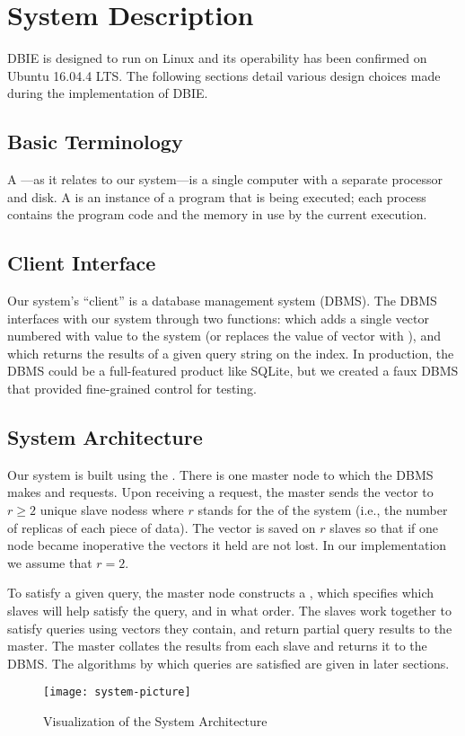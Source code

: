 \section{System Description}
DBIE is designed to run on Linux and its operability has been confirmed on
Ubuntu 16.04.4 LTS. The following sections detail various design choices made
during the implementation of DBIE.
%
\subsection{Basic Terminology}
A ---as it relates to our system---is a single computer with a
separate processor and disk. A  is an instance of a program that
is being executed; each process contains the program code and the memory in use
by the current execution.
%
\subsection{Client Interface}
Our system's ``client'' is a database management system (DBMS). The DBMS
interfaces with our system through two functions:  which adds a
single vector numbered  with value  to the system (or replaces
the value of vector  with ), and  which returns
the results of a given query string  on the index. In production, the
DBMS could be a full-featured product like SQLite, but we created a faux DBMS
that provided fine-grained control for testing.
%
\subsection{System Architecture}
Our system is built using the . There is one
master node to which the DBMS makes  and  requests.
Upon receiving a  request, the master sends the vector to
\(r \geq 2\) unique slave nodess where \(r\) stands for the
 of the system (i.e., the number of replicas of each
piece of data). The vector is saved on \(r\) slaves so that if
one node became inoperative the vectors it held are not lost. In our
implementation we assume that \(r = 2\).
\par
To satisfy a given query, the master node constructs a ,
which specifies which slaves will help satisfy the query, and
in what order. The slaves work together to satisfy queries using vectors they
contain, and return partial query results to the master. The master
collates the results from each slave and returns it to the DBMS.
The algorithms by which queries are satisfied are given in later sections.
%
\begin{figure}
    \texttt{[image: system-picture]}
    \caption{Visualization of the System Architecture}
    \label{fig:system-visualization}
\end{figure}
%
